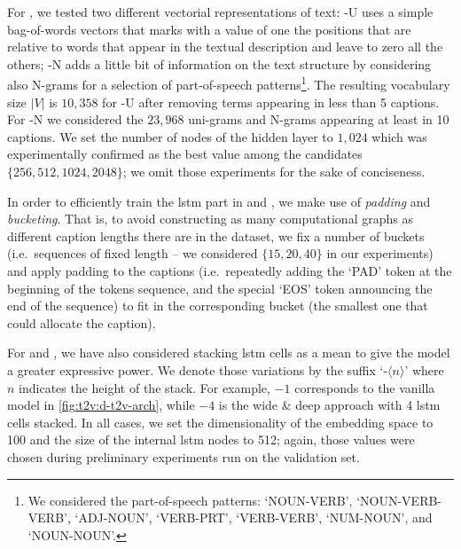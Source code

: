For \sparsettv{}, we tested two different vectorial representations of text: \sparsettv{}\textsc{-U} uses a simple bag-of-words vectors that marks with a value of one the positions that are relative to words that appear in the textual description and leave to zero all the others; \sparsettv{}\textsc{-N} adds a little bit of information on the text structure by considering also N-grams for a selection of part-of-speech patterns\footnote{We considered the part-of-speech patterns: `NOUN-VERB', `NOUN-VERB-VERB', `ADJ-NOUN', `VERB-PRT', `VERB-VERB', `NUM-NOUN', and `NOUN-NOUN'.}.
The resulting vocabulary size $|V|$ is $10,358$ for \sparsettv{}\textsc{-U} after removing terms appearing in less than 5 captions.
For \sparsettv{}\textsc{-N} we considered the $23,968$ uni-grams and N-grams appearing at least in 10 captions.
We set the number of nodes of the hidden layer to $1,024$ which was experimentally confirmed as the best value among the candidates $\{ 256, 512, 1024, 2048 \}$;
we omit those experiments for the sake of conciseness.

In order to efficiently train the \gls{lstm} part in \densettv{} and \widedeepttv{}, we make use of \emph{padding} and \emph{bucketing}.
That is, to avoid constructing as many computational graphs as different caption lengths there are in the dataset, we fix a number of buckets (i.e.\ sequences of fixed length -- we considered $\{15, 20, 40\}$ in our experiments) and apply padding to the captions (i.e.\ repeatedly adding the `PAD' token at the beginning of the tokens sequence, and the special `EOS' token announcing the end of the sequence) to fit in the corresponding bucket (the smallest one that could allocate the caption).

For \densettv{} and \widedeepttv{}, we have also considered stacking \gls{lstm} cells as a mean to give the model a greater expressive power.
We denote those variations by the suffix `-$\langle n\rangle$' where $n$ indicates the height of the stack.
For example, \densettv{}$-1$ corresponds to the vanilla model in \ref{fig:t2v:d-t2v-arch}, while \widedeepttv{}$-4$ is the wide \& deep approach with 4 \gls{lstm} cells stacked.
In all cases, we set the dimensionality of the embedding space to 100 and the size of the internal \gls{lstm} nodes to 512;
again, those values were chosen during preliminary experiments run on the validation set.

